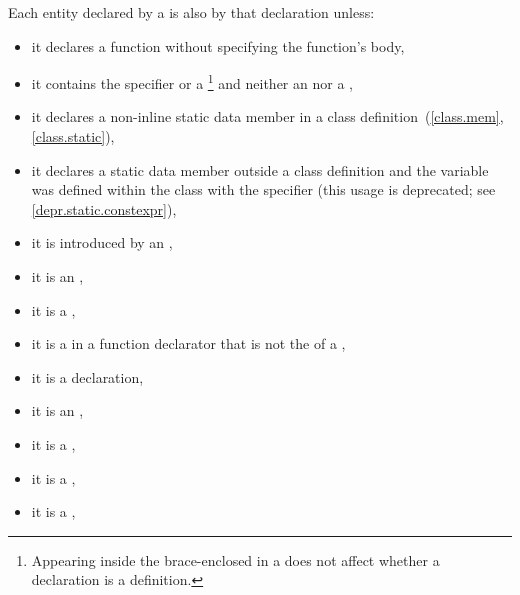 \pnum
{}%
%
Each entity declared by a  is
also  by that declaration unless:
\begin{itemize}
\item
it declares a function
without specifying the function's body,
\item
it contains
the
%
 specifier or a
\footnote{Appearing inside the brace-enclosed
 in a  does
not affect whether a declaration is a definition.}
and neither an  nor a
,
\item
{}%
it declares a non-inline static data member in a class
definition~(\ref{class.mem}, \ref{class.static}),
\item
it declares a static data member outside a class definition
and the variable was defined within the class with the 
specifier (this usage is deprecated; see \ref{depr.static.constexpr}),
\item
{}%
it is introduced by an ,
\item
it is an
%
,
\item
it is a
%
,
\item
it is a
%
 in a function
%
declarator that is not the  of a
,
\item
it is a
%
 declaration,
\item it is
an ,
\item it is
a
,
\item it is
a ,
\item it is
a ,

\end{itemize}
